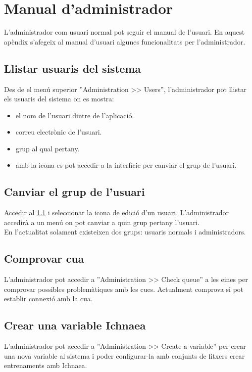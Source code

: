 \chapter{Manual d'administrador}
\label{cha:adminguide}

L'administrador com usuari normal pot seguir el manual de l'usuari. En aquest apèndix s'afegeix al manual d'usuari algunes funcionalitats per l'administrador.

\section{Llistar usuaris del sistema}
\label{sec:list_users}
Des de el menú superior ''Administration >> Users'', l'administrador pot llistar els usuaris del sistema on es mostra:
\begin{itemize}
\item el nom de l'usuari dintre de l'aplicació.
\item correu electrònic de l'usuari.
\item grup al qual pertany.
\item amb la icona \iconedit es pot accedir a la interfície per canviar el grup de l'usuari.
\end{itemize}

\section{Canviar el grup de l'usuari}
Accedir al \ref{sec:list_users} i seleccionar la icona de edici\'{o} d'un usuari. L'administrador accedir\`{a} a un menú on pot canviar a quin grup pertany l'usuari.\\

En l'actualitat solament existeixen dos grups: usuaris normals i administradors.

\section{Comprovar cua}
L'administrador pot accedir a ''Administration >> Check queue'' a les eines per comprovar possibles problem\`{a}tiques amb les cues. Actualment comprova si pot establir connexió amb la cua.

\section{Crear una variable Ichnaea}
L'administrador pot accedir a ''Administration >> Create a variable'' per crear una nova variable al sistema i poder configurar-la amb conjunts de fitxers crear entrenaments amb Ichnaea. 

